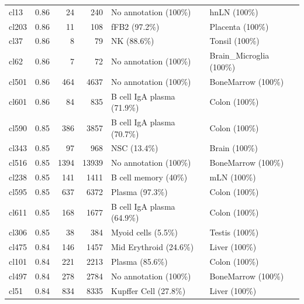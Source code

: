 \begin{table}[ht!]
\begin{tabular}{lrrrll}
  cl13 & 0.86 &  24 & 240 & No annotation (100\%) & hnLN (100\%) \\ 
  cl203 & 0.86 &  11 & 108 & fFB2 (97.2\%) & Placenta (100\%) \\ 
  cl37 & 0.86 &   8 &  79 & NK (88.6\%) & Tonsil (100\%) \\ 
  cl62 & 0.86 &   7 &  72 & No annotation (100\%) & Brain\_Microglia (100\%) \\ 
  cl501 & 0.86 & 464 & 4637 & No annotation (100\%) & BoneMarrow (100\%) \\ 
  cl601 & 0.86 &  84 & 835 & B cell IgA plasma (71.9\%) & Colon (100\%) \\ 
  cl590 & 0.85 & 386 & 3857 & B cell IgA plasma (70.7\%) & Colon (100\%) \\ 
  cl343 & 0.85 &  97 & 968 & NSC (13.4\%) & Brain (100\%) \\ 
  cl516 & 0.85 & 1394 & 13939 & No annotation (100\%) & BoneMarrow (100\%) \\ 
  cl238 & 0.85 & 141 & 1411 & B cell memory (40\%) & mLN (100\%) \\ 
  cl595 & 0.85 & 637 & 6372 & Plasma (97.3\%) & Colon (100\%) \\ 
  cl611 & 0.85 & 168 & 1677 & B cell IgA plasma (64.9\%) & Colon (100\%) \\ 
  cl306 & 0.85 &  38 & 384 & Myoid cells (5.5\%) & Testis (100\%) \\ 
  cl475 & 0.84 & 146 & 1457 & Mid Erythroid (24.6\%) & Liver (100\%) \\ 
  cl101 & 0.84 & 221 & 2213 & Plasma (85.6\%) & Colon (100\%) \\ 
  cl497 & 0.84 & 278 & 2784 & No annotation (100\%) & BoneMarrow (100\%) \\ 
  cl51 & 0.84 & 834 & 8335 & Kupffer Cell (27.8\%) & Liver (100\%) \\ 
   \bottomrule
\end{tabular}
\end{table}  
  
